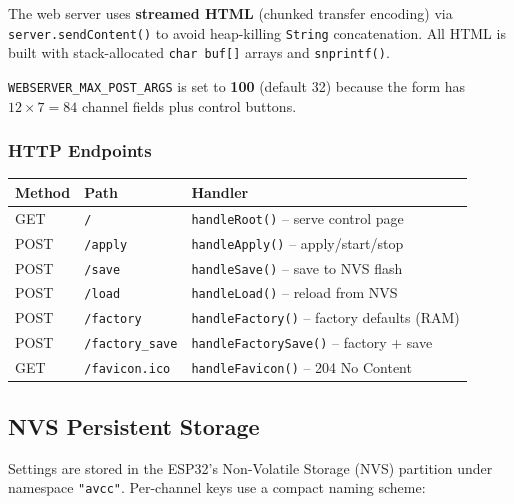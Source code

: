 \documentclass[11pt,a4paper]{article}
\begin{document}
The web server uses \textbf{streamed HTML} (chunked transfer encoding) via
\texttt{server.sendContent()} to avoid heap-killing \texttt{String}
concatenation. All HTML is built with stack-allocated \texttt{char buf[]}
arrays and \texttt{snprintf()}.

\texttt{WEBSERVER\_MAX\_POST\_ARGS} is set to \textbf{100} (default 32) because
the form has $12 \times 7 = 84$ channel fields plus control buttons.

\subsubsection{HTTP Endpoints}

\begin{center}
\begin{tabular}{lll}
\toprule
\textbf{Method} & \textbf{Path} & \textbf{Handler} \\
\midrule
GET  & \texttt{/}             & \texttt{handleRoot()} -- serve control page \\
POST & \texttt{/apply}        & \texttt{handleApply()} -- apply/start/stop \\
POST & \texttt{/save}         & \texttt{handleSave()} -- save to NVS flash \\
POST & \texttt{/load}         & \texttt{handleLoad()} -- reload from NVS \\
POST & \texttt{/factory}      & \texttt{handleFactory()} -- factory defaults (RAM) \\
POST & \texttt{/factory\_save} & \texttt{handleFactorySave()} -- factory + save \\
GET  & \texttt{/favicon.ico}  & \texttt{handleFavicon()} -- 204 No Content \\
\bottomrule
\end{tabular}
\end{center}

\subsection{NVS Persistent Storage}

Settings are stored in the ESP32's Non-Volatile Storage (NVS) partition
under namespace \texttt{"avcc"}. Per-channel keys use a compact naming scheme:
\end{document}
